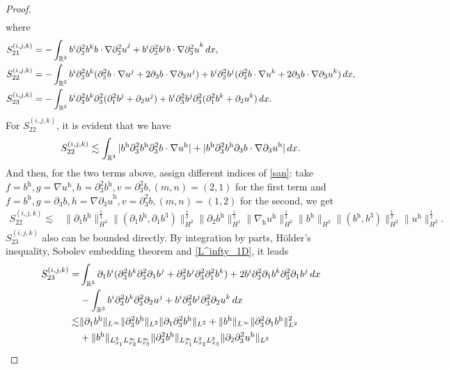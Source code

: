 \documentclass[10pt,a4paper]{amsart}
\newcommand{\R}{\mathbb{R}}
\newcommand{\dx}{\,{\rm d}x}
\newcommand{\h}{\mathrm{h}}
\newcommand{\nablah}{\nabla_{\mathrm{h}}}
\begin{document}
\begin{proof}
\begin{align*}
	\end{align*}
	where
	\begin{align*}
		S^{(i,j,k)}_{21}&=-\int_{\R^3} b^i\partial_3^2b^k b\cdot\nabla{\partial_3^2u}^j+b^i\partial_3^2b^jb\cdot\nabla{\partial_3^2u}^k\dx,\\
		S^{(i,j,k)}_{22}&=-\int_{\R^3} b^i\partial_3^2b^k(\partial_3^2 b\cdot\nabla{u}^j+2\partial_3 b\cdot\nabla{\partial_3u}^j)+b^i\partial_3^2b^j(\partial_3^2b\cdot\nabla{u}^k+2\partial_3b\cdot\nabla{\partial_3u}^k)\dx,\\
		S^{(i,j,k)}_{23}&=-\int_{\R^3} b^i\partial_3^2b^k\partial_3^2(\partial_1^2b^j +\partial_2u^j)+ b^i\partial_3^2b^j\partial_3^2(\partial_1^2b^k +\partial_2u^k)\dx.
	\end{align*}
	For $S^{(i,j,k)}_{22}$, it is evident that we have
	\begin{align*}
		S^{(i,j,k)}_{22}\lesssim\int_{\R^3} |b^\h\partial_3^2b^\h\partial_3^2 b\cdot\nabla{u}^\h|+|b^\h\partial_3^2b^\h\partial_3 b\cdot\nabla{\partial_3u}^\h|\dx.
	\end{align*}
	And then, for the two terms above, assign different indices of \eqref{san}: take $f=b^\h,g=\nabla{u}^\h,h=\partial_3^2b^\h,v=\partial_3^2 b,(m,n)=(2,1)$ for the first term and $f=b^\h,g=\partial_3 b,h=\nabla{\partial_3u}^\h,v=\partial_3^2 b,(m,n)=(1,2)$ for the second, we get
	\begin{align}\label{S22}
		S^{(i,j,k)}_{22}
		\lesssim&\|\partial_1b^\h\|_{H^2}^\frac12\|(\partial_1b^\h,\partial_1b^3)\|_{H^2}^\frac12\|\partial_2b^\h\|_{H^1}^\frac12\|\nablah u^\h\|_{H^2}^\frac12\|b^\h\|_{H^2}\|(b^\h,b^3)\|_{H^2}^\frac12\|u^\h\|_{H^2}^\frac12.
	\end{align}
	$S^{(i,j,k)}_{23}$ also can be bounded directly. By  integration by parts, H\"older's inequality, Sobolev embedding theorem and \eqref{L^infty_1D}, it leads
	\begin{align}\label{S23}
		S^{(i,j,k)}_{23}=&\int_{\R^3} \partial_1b^i(\partial_3^2b^k\partial_3^2\partial_1b^j + \partial_3^2b^j\partial_3^2\partial_1^2b^k) +2b^i\partial_3^2\partial_1b^k\partial_3^2\partial_1b^j\dx\nonumber\\
		&-\int_{\R^3} b^i\partial_3^2b^k\partial_3^2\partial_2u^j+ b^i\partial_3^2b^j\partial_3^2\partial_2u^k\dx\nonumber\\
		\lesssim&\|\partial_1b^\h\|_{L^\infty}\|\partial_3^2b^\h\|_{L^2}\|\partial_1\partial_3^2b^\h\|_{L^2}+\|b^\h\|_{L^\infty}\|\partial_3^2\partial_1b^\h\|_{L^2}^2\nonumber\\
		&+\|b^\h\|_{L^2_{x_1}L^\infty_{x_2}L^\infty_{x_3}}\|\partial_3^2b^\h\|_{L^\infty_{x_1}L^2_{x_2}L^2_{x_3}}\|\partial_2\partial_3^2u^\h\|_{L^2}\nonumber\\

\end{align}
\end{proof}
\end{document}
